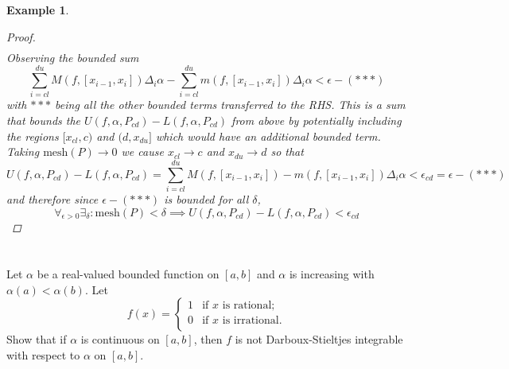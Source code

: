 \documentclass[]{article}
\newtheorem{example}{Example}
\begin{document}
\begin{example}
\begin{proof}
\begin{align*}
        \end{align*}
        Observing the bounded sum \[
            \sum_{i=cl}^{du} M(f, [x_{i-1},x_{i}]) \Delta_i \alpha 
            - \sum_{i=cl}^{du} m(f, [x_{i-1},x_{i}]) \Delta_i \alpha
            < \epsilon - (***)
        \] with $***$ being all the other bounded terms transferred to the RHS.
        This is a sum that bounds the $U(f,\alpha,P_{cd}) - L(f,\alpha,P_{cd})$ from above by potentially including the regions $[x_{cl}, c)$ and $(d, x_{du}]$ which would have an additional bounded term.
        Taking $\text{mesh}(P) \to 0$ we cause $x_{cl} \to c$ and $x_{du} \to d$ so that \[
            U(f,\alpha,P_{cd}) - L(f,\alpha,P_{cd}) 
                = \sum_{i=cl}^{du} M(f, [x_{i-1},x_{i}]) - m(f, [x_{i-1}, x_{i}]) \Delta_i \alpha
                < \epsilon_{cd} = \epsilon - (***)
        \] and therefore since $\epsilon - (***)$ is bounded for all $\delta$, \[
            \forall_{\epsilon>0} \exists_{\delta} : \text{mesh}(P) < \delta \implies U(f,\alpha,P_{cd}) - L(f,\alpha,P_{cd}) < \epsilon_{cd}
        \]
    \end{proof}
\end{example}

\newpage
\section{}
Let $\alpha$ be a real-valued bounded function on $[a,b]$ and $\alpha$ is increasing with $\alpha(a) < \alpha(b)$. 
Let \[
    f(x) = \begin{cases}
        1   &\text{if $x$ is rational};\\
        0   &\text{if $x$ is irrational}.\\
    \end{cases}
\] Show that if $\alpha$ is continuous on $[a,b]$, then $f$ is not Darboux-Stieltjes integrable with respect to $\alpha$ on $[a,b]$.
\end{document}

